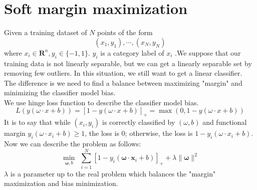 



\section{Soft margin maximization}
Given a training dataset of $\displaystyle N$ points of the form
$$(x_{1},y_{1}),\cdots,(x_{N},y_{N})$$
where $\displaystyle x_{i}\in \mathbf{R}^n,y_{i}\in \{-1,1\}$. $\displaystyle y_{i}$ is a category label of $\displaystyle x_{i}$ .We suppose that our training data is not linearly separable, but we can get a linearly separable set by removing few outliers. In this situation, we still want to get a linear classifier. The difference is we need to find a balance between maximizing "margin" and minimizing the classifier model bias.\\
We use hinge loss function to describe the classifier model bias.
\begin{equation}
L(y(\omega\cdot x+b))=[1-y(\omega\cdot x+b)]_{+}=\max(0,1-y(\omega\cdot x+b))
\end{equation}
It is to say that while $(x_{i},y_{i})$ is correctly classified by $(\omega,b)$ and functional margin $y_{i}(\omega\cdot x_{i}+b)\ge 1$, the loss is 0; otherwise, the loss is $1-y_{i}(\omega\cdot x_{i}+b)$.
Now we can describe the problem as follows:
\begin{equation}
  \min_{\bm\omega,b}\ \ \sum_{i=1}^{N}[1-y_{i}(\bm\omega\cdot\bm x_{i}+b)]_{+}+\lambda\|\bm\omega\|^2
\end{equation}
$\lambda$ is a parameter up to the real problem which balances the "margin" maximization and bias minimization.

